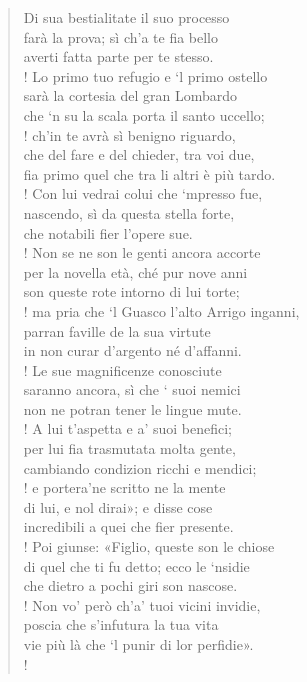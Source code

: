 \documentclass[a4paper, twoside, titlepage]{book}
\begin{document}
\begin{verse}
Di sua bestialitate il suo processo\\
farà la prova; sì ch’a te fia bello\\
averti fatta parte per te stesso.\\!
Lo primo tuo refugio e ‘l primo ostello\\
sarà la cortesia del gran Lombardo\\
che ‘n su la scala porta il santo uccello;\\!
ch’in te avrà sì benigno riguardo,\\
che del fare e del chieder, tra voi due,\\
fia primo quel che tra li altri è più tardo.\\!
Con lui vedrai colui che ‘mpresso fue,\\
nascendo, sì da questa stella forte,\\
che notabili fier l’opere sue.\\!
Non se ne son le genti ancora accorte\\
per la novella età, ché pur nove anni\\
son queste rote intorno di lui torte;\\!
ma pria che ‘l Guasco l’alto Arrigo inganni,\\
parran faville de la sua virtute\\
in non curar d’argento né d’affanni.\\!
Le sue magnificenze conosciute\\
saranno ancora, sì che ‘ suoi nemici\\
non ne potran tener le lingue mute.\\!
A lui t’aspetta e a’ suoi benefici;\\
per lui fia trasmutata molta gente,\\
cambiando condizion ricchi e mendici;\\!
e portera’ne scritto ne la mente\\
di lui, e nol dirai»; e disse cose\\
incredibili a quei che fier presente.\\!
Poi giunse: «Figlio, queste son le chiose\\
di quel che ti fu detto; ecco le ‘nsidie\\
che dietro a pochi giri son nascose.\\!
Non vo’ però ch’a’ tuoi vicini invidie,\\
poscia che s’infutura la tua vita\\
vie più là che ‘l punir di lor perfidie».\\!

\end{verse}
\end{document}
